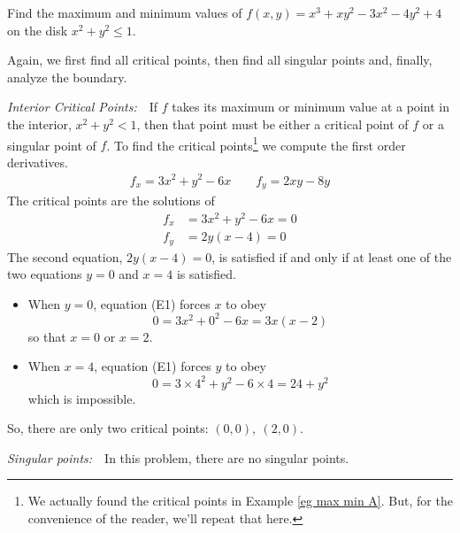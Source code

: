 \begin{eg}\label{eg:MXMNabsB}
Find the maximum and minimum values of $f(x,y)=x^3+xy^2-3x^2-4y^2+4$
on the disk $x^2+y^2\le 1$.

\soln 
Again, we first find all critical points, then find all singular points
and, finally, analyze the boundary.

\noindent\emph{Interior Critical Points:}\ \ 
If $f$ takes its maximum or minimum value at a point in the interior, 
$x^2+y^2<1$, then that point must be either a critical point of $f$ 
or a singular point of $f$.
To find the critical points\footnote{We actually found the critical points in
Example \ref{eg max min A}. But, for the convenience of the reader, we'll repeat that here.} we compute the first order derivatives.
\begin{align*}
f_x=3x^2+y^2-6x \qquad
f_y=2xy-8y 
\end{align*}
The critical points are the solutions of
\begin{align*}
f_x&=3x^2+y^2-6x=0 \tag{E1}\\
f_y&=2y(x-4)=0 \tag{E2}
\end{align*}
The second equation, $2y(x-4)=0 $, is satisfied if and only if at least 
one of the two equations $y=0$ and $x=4$ is satisfied.
\begin{itemize}
\item
When $y=0$, equation (E1) forces $x$ to obey 
\begin{equation*}
0=3x^2+0^2-6x=3x(x-2)
\end{equation*}
so that $x=0$ or $x=2$.
\item
When $x=4$, equation (E1) forces $y$ to obey 
\begin{equation*}
0=3\times 4^2+y^2-6\times 4=24+y^2
\end{equation*} 
which is impossible.
\end{itemize}
So, there are only two critical points: $(0,0),\ (2,0)$.

\smallskip
\noindent\emph{Singular points:}\ \  In this problem, there are no singular 
points.



\end{eg}

